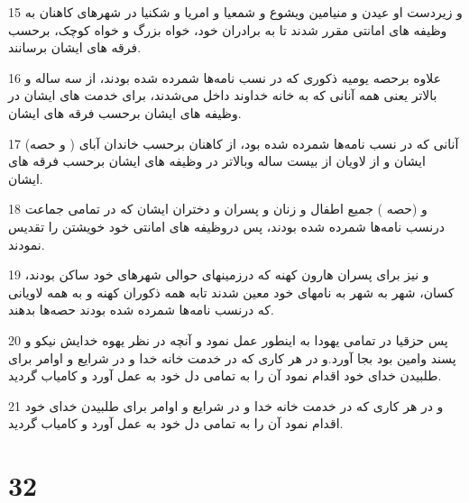 \par 15 و زیردست او عیدن و منیامین ویشوع و شمعیا و امریا و شکنیا در شهرهای کاهنان به وظیفه های امانتی مقرر شدند تا به برادران خود، خواه بزرگ و خواه کوچک، برحسب فرقه های ایشان برسانند.
\par 16 علاوه برحصه یومیه ذکوری که در نسب نامه‌ها شمرده شده بودند، از سه ساله و بالاتر یعنی همه آنانی که به خانه خداوند داخل می‌شدند، برای خدمت های ایشان در وظیفه های ایشان برحسب فرقه های ایشان.
\par 17 (و حصه ) آنانی که در نسب نامه‌ها شمرده شده بود، از کاهنان برحسب خاندان آبای ایشان و از لاویان از بیست ساله وبالاتر در وظیفه های ایشان برحسب فرقه های ایشان.
\par 18 و (حصه ) جمیع اطفال و زنان و پسران و دختران ایشان که در تمامی جماعت درنسب نامه‌ها شمرده شده بودند، پس دروظیفه های امانتی خود خویشتن را تقدیس نمودند.
\par 19 و نیز برای پسران هارون کهنه که درزمینهای حوالی شهرهای خود ساکن بودند، کسان، شهر به شهر به نامهای خود معین شدند تابه همه ذکوران کهنه و به همه لاویانی که درنسب نامه‌ها شمرده شده بودند حصه‌ها بدهند.
\par 20 پس حزقیا در تمامی یهودا به اینطور عمل نمود و آنچه در نظر یهوه خدایش نیکو و پسند وامین بود بجا آورد.و در هر کاری که در خدمت خانه خدا و در شرایع و اوامر برای طلبیدن خدای خود اقدام نمود آن را به تمامی دل خود به عمل آورد و کامیاب گردید.
\par 21 و در هر کاری که در خدمت خانه خدا و در شرایع و اوامر برای طلبیدن خدای خود اقدام نمود آن را به تمامی دل خود به عمل آورد و کامیاب گردید.
 
\chapter{32}

